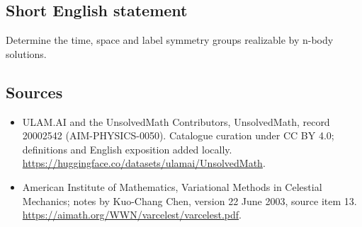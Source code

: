 \documentclass[11pt]{article}
\begin{document}
\subsection{Short English statement}
Determine the time, space and label symmetry groups realizable by n-body solutions.
\subsection{Sources}
\begin{itemize}
\item[\hypertarget{source:20002542:1}{S1}] ULAM.AI and the UnsolvedMath Contributors, UnsolvedMath, record 20002542 (AIM-PHYSICS-0050). Catalogue curation under CC BY 4.0; definitions and English exposition added locally.
\url{https://huggingface.co/datasets/ulamai/UnsolvedMath}.
\item[\hypertarget{source:20002542:2}{S2}] American Institute of Mathematics, Variational Methods in Celestial Mechanics; notes by Kuo-Chang Chen, version 22 June 2003, source item 13.
\url{https://aimath.org/WWN/varcelest/varcelest.pdf}.
\end{itemize}
\label{end:20002542}
\end{document}
